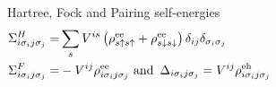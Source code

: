 \documentclass{beamer}
\begin{document}
\begin{frame}
\begin{columns}
\column{8cm}
\begin{exampleblock}{Hartree, Fock and Pairing self-energies}
\vspace*{-4mm}
\begin{align*}
\Sigma_{i\sigma_{i}j\sigma_{j}}^{H}=&\sum_{s}V^{is}\left(\rho_{s\uparrow s\uparrow}^{\text{\text{ee}}}+\rho_{s\downarrow s\downarrow}^{\text{\text{ee}}}\right)\delta_{ij}\delta_{\sigma_{i}\sigma_{j}}\\\Sigma_{i\sigma_{i}j\sigma_{j}}^{F}=&-V^{ij}\rho_{i\sigma_{i}j\sigma_{j}}^{\text{ee}}\text{ and }\,\Delta_{i\sigma_{i}j\sigma_{j}}=V^{ij}\rho_{i\sigma_{i}j\sigma_{j}}^{\text{eh}}
\end{align*}
\end{exampleblock}
\end{columns}

\end{frame}
\end{document}
